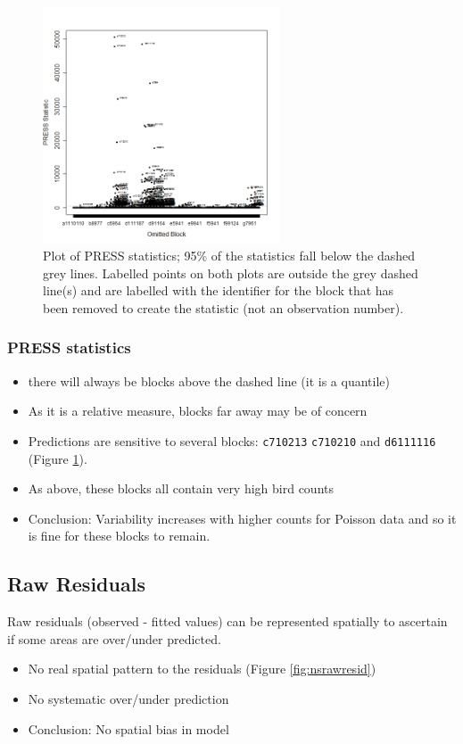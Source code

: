 \begin{frame}[fragile]
\begin{figure}[h]
  \centering
    \includegraphics[width=7cm]{bc/InfluenceMeasures_press.png}
  \caption{Plot of PRESS statistics; 95\% of the statistics fall below the dashed grey lines.  Labelled points on both plots are outside the grey dashed line(s) and are labelled with the identifier for the block that has been removed to create the statistic (not an observation number).}
  \label{fig:nsinfluence2}
\end{figure}
\end{frame}


\begin{frame}
\frametitle{PRESS statistics}
\begin{itemize}
  \item there will always be blocks above the dashed line (it is a quantile)
  \item As it is a relative measure, blocks far away may be of concern
  \item Predictions are sensitive to several blocks: {\tt c710213} {\tt c710210} and {\tt d6111116} (Figure \ref{fig:nsinfluence2}).
  \item As above, these blocks all contain very high bird counts  
  \bigskip
  \item Conclusion: Variability increases with higher counts for Poisson data and so it is fine for these blocks to remain. 
\end{itemize}
\end{frame}

\subsection{Raw Residuals}
\begin{frame}[fragile]
Raw residuals (observed - fitted values) can be represented spatially to ascertain if some areas are over/under predicted.  

\begin{itemize}
\item No real spatial pattern to the residuals (Figure \ref{fig:nsrawresid})
\item No systematic over/under prediction
\bigskip
\item Conclusion: No spatial bias in model
\end{itemize}
\end{frame}

